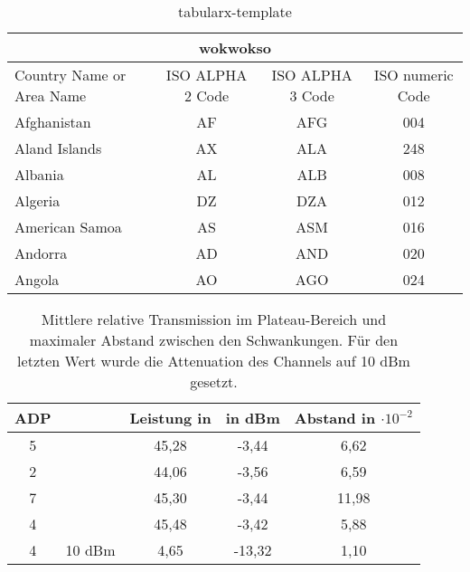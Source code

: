 \begin{table}[h]
    \caption{tabularx-template}
    \label{tablex:1}
    \begin{tabularx}{\textwidth}{ X||ccc  } %
    	\hline
    	\multicolumn{4}{|c|}{wokwokso} \\ %
    	\hline
    	Country Name or Area Name& ISO ALPHA 2 Code &ISO ALPHA 3 Code&ISO numeric Code\\
    	\hline
    	Afghanistan   & AF    &AFG&   004\\
    	Aland Islands&   AX  & ALA   &248\\
    	Albania &AL & ALB&  008\\
    	Algeria    &DZ & DZA&  012\\
    	American Samoa&   AS  & ASM&016\\
    	Andorra& AD  & AND   &020\\
    	Angola& AO  & AGO&024\\
    	\hline
    \end{tabularx}
\end{table}

\begin{table}[ht]
    \centering
     \caption[Mittlere relative Transmission]{Mittlere relative Transmission im Plateau-Bereich und maximaler Abstand zwischen den Schwankungen. Für den letzten Wert wurde die Attenuation des Channels auf 10 dBm gesetzt.}
    \begin{tabular}{c c c c c  }
        \toprule
        ADP &  & Leistung in & in dBm & Abstand in $\cdot 10^{-2}$  \\
        \midrule
        5 & & 45,28 & -3,44 & 6,62 \\
        2 & & 44,06 & -3,56 & 6,59 \\
        7 & & 45,30 & -3,44 & 11,98 \\
        4 & & 45,48 & -3,42 & 5,88 \\
        4 & 10 dBm & 4,65 & -13,32 & 1,10 \\
        \bottomrule
    \end{tabular}
    \label{tab:Mittelwerte}
\end{table}